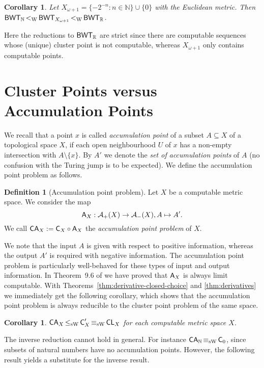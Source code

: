 \documentclass[a4paper]{amsart}
\def\AA{{\mathcal A}}
\def\IN{{\mathbb{N}}}
\def\IR{{\mathbb{R}}}
\def\In{\subseteq}
\def\BWT{\text{\rm\sffamily BWT}}
\def\C{\mbox{\rm\sffamily C}}
\def\CA{\text{\rm\sffamily C$_{\rm\mathsf A}$}}
\def\CL{\text{\rm\sffamily CL}}
\def\A{\text{\rm\sffamily A}}
\def\CA{\text{\rm\sffamily CA}}
\def\leqSW{\mathop{\leq_{\mathrm{sW}}}}
\def\equivSW{\mathop{\equiv_{\mathrm{sW}}}}
\def\lW{\mathop{<_{\mathrm{W}}}}
\newcommand{\omu}{{\omega+1}}
\newtheorem{corollary}[theorem]{Corollary}
\theoremstyle{definition}
\newtheorem{definition}[theorem]{Definition}
\begin{document}
\begin{corollary}
\label{cor:X-omega}
Let $X_\omu = \{-2^{-n}:n \in \IN\} \cup \{0\}$ with the
Euclidean metric. Then $\BWT_\IN\lW\BWT_{X_\omu}\lW\BWT_\IR$.
\end{corollary}

Here the reductions to $\BWT_\IR$ 
are strict 
since there are computable sequences whose (unique) cluster point is
not computable, whereas $X_\omu$ only contains computable points.


\section{Cluster Points versus Accumulation Points}

We recall that a point $x$ is called {\em accumulation point} of a subset $A\In X$ of a topological space $X$,
if each open neighbourhood $U$ of $x$ has a non-empty intersection with $A\setminus\{x\}$.
By $A'$ we denote the {\em set of accumulation points} of $A$ (no confusion with the Turing jump is to be expected).
We define the accumulation point problem as follows.

\begin{definition}[Accumulation point problem]
Let $X$ be a computable metric space. We consider the map
\[\A_X:\AA_+(X)\to\AA_-(X),A\mapsto A'.\]
We call $\CA_X:=\C_X\circ\A_X$ the {\em accumulation point problem} of $X$.
\end{definition}

We note that the input $A$ is given with respect to positive information, whereas the output $A'$
is required with negative information. The accumulation point problem is particularly well-behaved for these
types of input and output information.
In Theorem~9.6 of \cite{BG09} we have proved that $\A_X$ is always limit computable.
With Theorems~\ref{thm:derivative-closed-choice} and \ref{thm:derivatives} we immediately 
get the following corollary, which shows that the accumulation point
problem is always reducible to the cluster point problem of the same space.

\begin{corollary}
$\CA_X\leqSW\C_X'\equivSW\CL_X$ for each computable metric space $X$.
\end{corollary}

The inverse reduction cannot hold in general. For instance $\CA_\IN\equivSW\C_0$, since
subsets of natural numbers have no accumulation points. However, the following 
result yields a substitute for the inverse result.
\end{document}
